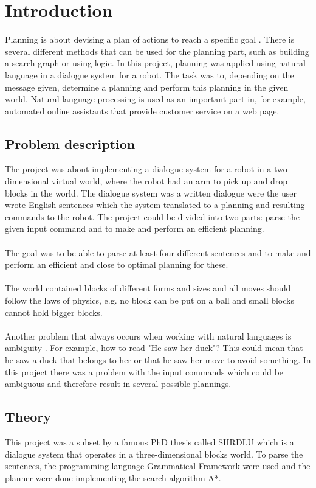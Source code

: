 \chapter{Introduction}
Planning is about devising a plan of actions to reach a specific goal
\citep{planning_ai}. There is several different methods that can be used for
the planning part, such as building a search graph or using logic. In this
project, planning was applied using natural language in a dialogue system for a
robot. The task was to, depending on the message given, determine a planning
and perform this planning in the given world. Natural language processing is
used as an important part in, for example, automated online assistants that
provide customer service on a web page. 

\section{Problem description}
The project was about implementing a dialogue system for a robot in a
two-dimensional virtual world, where the robot had an arm to pick up and drop
blocks in the world. The dialogue system was a written dialogue were the user
wrote English sentences which the system translated to a planning and resulting
commands to the robot. The project could be divided into two parts: parse the
given input command and to make and perform an efficient planning. \\\\
The goal was to be able to parse at least four different sentences and to make
and perform an efficient and close to optimal planning for these. 
\\\\
The world contained blocks of different forms and sizes and all moves should
follow the laws of physics, e.g. no block can be put on a ball and small blocks
cannot hold bigger blocks. \\\\ Another problem that always occurs when working
with natural languages is ambiguity \citep{naturallang_ai}. For example, how to
read "He saw her duck"? This could mean that he saw a duck that belongs to her
or that he saw her move to avoid something. In this project there was a problem
with the input commands which could be ambiguous and therefore result in
several possible plannings. 

\section{Theory}
This project was a subset by a famous PhD thesis called SHRDLU which  is a
dialogue system that operates in a three-dimensional blocks world. To parse the
sentences, the programming language Grammatical Framework were used and the
planner were done implementing the search algorithm A*.

